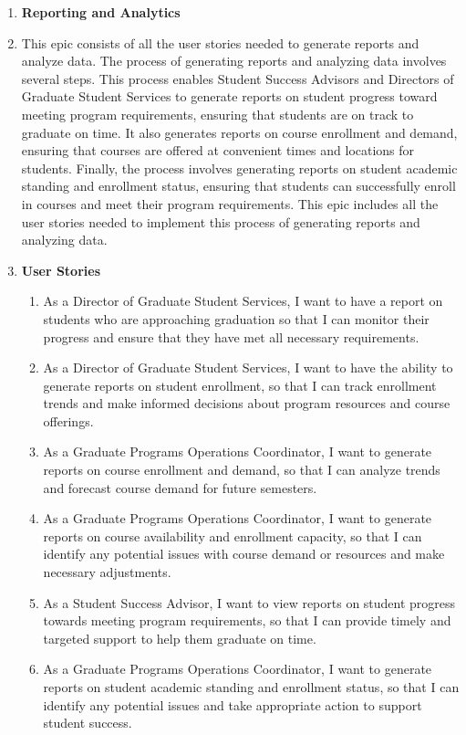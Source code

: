 \documentclass[12pt]{article}
\begin{document}
\begin{appendices}
\begin{enumerate}[label=(\roman*)]
        \item \textbf{Reporting and Analytics}
        \item[] This epic consists of all the user stories needed to generate reports and analyze data. The process of generating reports and analyzing data involves several steps. This process enables Student Success Advisors and Directors of Graduate Student Services to generate reports on student progress toward meeting program requirements, ensuring that students are on track to graduate on time. It also generates reports on course enrollment and demand, ensuring that courses are offered at convenient times and locations for students. Finally, the process involves generating reports on student academic standing and enrollment status, ensuring that students can successfully enroll in courses and meet their program requirements. This epic includes all the user stories needed to implement this process of generating reports and analyzing data.
        \item[] \textbf{User Stories}
        \begin{enumerate}
            \item As a Director of Graduate Student Services, I want to have a report on students who are approaching graduation so that I can monitor their progress and ensure that they have met all necessary requirements.
            \item As a Director of Graduate Student Services, I want to have the ability to generate reports on student enrollment, so that I can track enrollment trends and make informed decisions about program resources and course offerings.
            \item As a Graduate Programs Operations Coordinator, I want to generate reports on course enrollment and demand, so that I can analyze trends and forecast course demand for future semesters.
            \item As a Graduate Programs Operations Coordinator, I want to generate reports on course availability and enrollment capacity, so that I can identify any potential issues with course demand or resources and make necessary adjustments.
            \item As a Student Success Advisor, I want to view reports on student progress towards meeting program requirements, so that I can provide timely and targeted support to help them graduate on time.
            \item As a Graduate Programs Operations Coordinator, I want to generate reports on student academic standing and enrollment status, so that I can identify any potential issues and take appropriate action to support student success.                                  
        \end{enumerate}



\end{enumerate}
\end{appendices}
\end{document}
